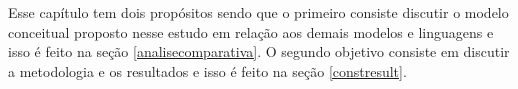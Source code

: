 Esse capítulo tem dois propósitos sendo que o primeiro consiste discutir o modelo conceitual proposto nesse estudo em relação aos demais modelos e linguagens e isso é feito na seção  \ref{analisecomparativa}. O segundo objetivo consiste em discutir a metodologia e os resultados e isso é feito na seção \ref{constresult}.